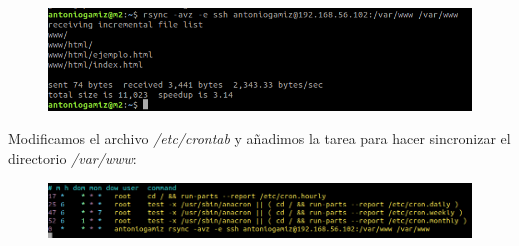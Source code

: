 \documentclass[12pt]{article}
\begin{document}
\begin{figure}[H]
   \center
  \includegraphics[scale=0.5]{img/4.png}
\end{figure}

Modificamos el archivo \textit{/etc/crontab} y añadimos la tarea para hacer sincronizar el directorio \textit{/var/www}:

\begin{figure}[H]
   \center
  \includegraphics[scale=0.5]{img/6.png}
\end{figure}
\end{document}
